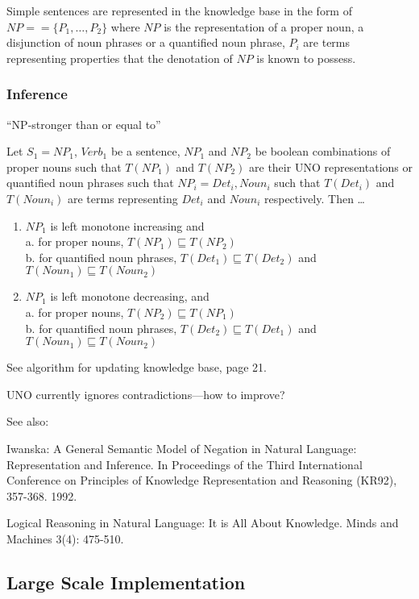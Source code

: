 \documentclass[11pt]{article}
\begin{document}
Simple sentences are represented in the knowledge base in the form of $NP == \{P_1,\dots,P_2\}$ where $NP$ is the representation of a proper noun, a disjunction of noun phrases or a quantified noun phrase, $P_i$ are terms representing properties that the denotation of $NP$ is known to possess.

\subsubsection{Inference}

``NP-stronger than or equal to''

Let $S_1 = NP_1$, $Verb_1$ be a sentence, $NP_1$ and $NP_2$ be boolean combinations of proper nouns such that $T(NP_1)$ and $T(NP_2)$ are their UNO representations or quantified noun phrases such that $NP_i = Det_i, Noun_i$ such that $T(Det_i)$ and $T(Noun_i)$ are terms representing $Det_i$ and $Noun_i$ respectively.  Then \ldots

\begin{enumerate}
\item $NP_1$ is left monotone increasing and \\
    a. for proper nouns, $T(NP_1) \sqsubseteq T(NP_2)$ \\
    b. for quantified noun phrases, $T(Det_1) \sqsubseteq T(Det_2)$ and $T(Noun_1) \sqsubseteq T(Noun_2)$
\item $NP_1$ is left monotone decreasing, and \\
    a. for proper nouns, $T(NP_2) \sqsubseteq T(NP_1)$ \\
    b. for quantified noun phrases, $T(Det_2) \sqsubseteq T(Det_1)$ and $T(Noun_1) \sqsubseteq T(Noun_2)$
\end{enumerate}

See algorithm for updating knowledge base, page 21.

UNO currently ignores contradictions---how to improve?

See also: 

Iwanska: A General Semantic Model of Negation in Natural Language: Representation and Inference. In Proceedings of the Third International Conference on Principles of Knowledge Representation and Reasoning (KR92), 357-368. 1992.

Logical Reasoning in Natural Language: It is All About Knowledge. Minds and Machines 3(4): 475-510.

\subsection{Large Scale Implementation}
\end{document}
